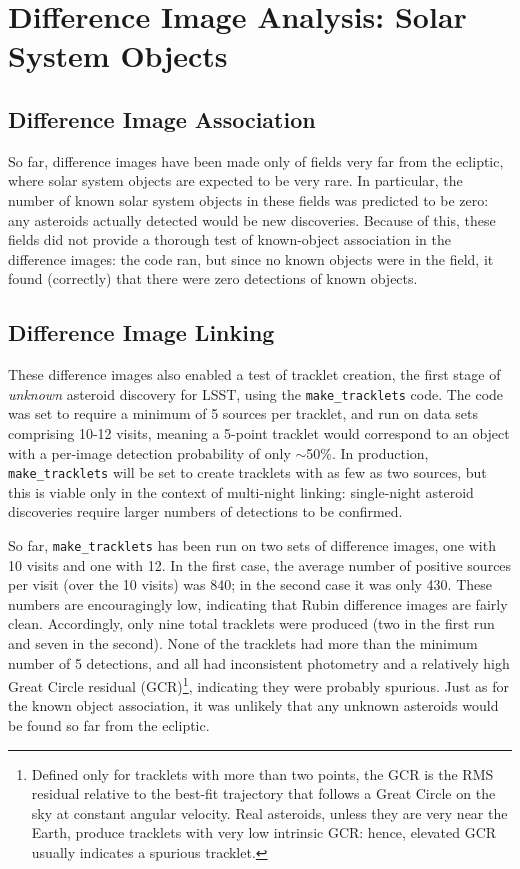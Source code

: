 \section{Difference Image Analysis: Solar System Objects}
\label{sec:dia_solar_system}

\subsection{Difference Image Association}
\label{sec:dia_solar_system_assoc}

So far, difference images have been made only of fields very far from the ecliptic, where solar system objects are expected to be very rare. In particular, the number of known solar system objects in these fields was predicted to be zero: any asteroids actually detected would be new discoveries. Because of this, these fields did not provide a thorough test of known-object association in the difference images: the code ran, but since no known objects were in the field, it found (correctly) that there were zero detections of known objects.

\subsection{Difference Image Linking}
\label{sec:dia_solar_system_link}

These difference images also enabled a test of tracklet creation, the first stage of {\em unknown} asteroid discovery for LSST, using the {\tt make\_tracklets} code. The code was set to require a minimum of 5 sources per tracklet, and run on data sets comprising 10-12 visits, meaning a 5-point tracklet would correspond to an object with a per-image detection probability of only $\sim$50\%. In production, {\tt make\_tracklets} will be set to create tracklets with as few as two sources, but this is viable only in the context of multi-night linking: single-night asteroid discoveries require larger numbers of detections to be confirmed.

So far, {\tt make\_tracklets} has been run on two sets of difference images, one with 10 visits and one with 12.  In the first case, the average number of positive sources per visit (over the 10 visits) was 840; in the second case it was only 430. These numbers are encouragingly low, indicating that Rubin difference images are fairly clean. Accordingly, only nine total tracklets were produced (two in the first run and seven in the second). None of the tracklets had more than the minimum number of 5 detections, and all had inconsistent photometry and a relatively high Great Circle residual (GCR)\footnote{Defined only for tracklets with more than two points, the GCR is the RMS residual relative to the best-fit trajectory that follows a Great Circle on the sky at constant angular velocity. Real asteroids, unless they are very near the Earth, produce tracklets with very low intrinsic GCR: hence, elevated GCR usually indicates a spurious tracklet.}, indicating they were probably spurious. Just as for the known object association, it was unlikely that any unknown asteroids would be found so far from the ecliptic.

